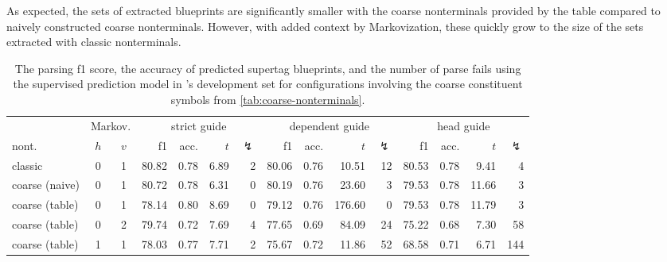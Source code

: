 \documentclass[../../document.tex]{subfiles}
\begin{document}
    As expected, the sets of extracted blueprints are significantly smaller with the coarse nonterminals provided by the table compared to naively constructed coarse nonterminals.
    However, with added context by Markovization, these quickly grow to the size of the sets extracted with classic nonterminals.

    \begin{table}
        \caption{\label{tbl:gridsearch:coarse:2}
        The parsing f1 score, the accuracy of predicted supertag blueprints, and the number of parse fails using the supervised prediction model in \negra{}'s development set for configurations involving the coarse constituent symbols from \cref{tab:coarse-nonterminals}.
        }
        \centering
        \vspace{.2cm}
        \setlength{\tabcolsep}{3.4pt}
        \begin{tabular}{lcc|rrrr|rrrr|rrrr}
            \toprule
& \multicolumn{2}{c|}{Markov.}         & \multicolumn{4}{c|}{strict guide} &  \multicolumn{4}{c|}{dependent guide} &  \multicolumn{4}{c}{head guide} \\
nont.           & \(h\) & \(v\) & f1 & acc. & $t$ & $\lightning$ & f1 & acc. & $t$ & $\lightning$  & f1 & acc. & $t$ & $\lightning$  \\ \hline\rowcolor{black!10}
classic        & 0 & 1 & 80.82 & 0.78 & 6.89 & 2 & 80.06 & 0.76 &  10.51 & 12 & 80.53 & 0.78 &  9.41 & 4 \\\rowcolor{black!10}
coarse (naive) & 0 & 1 & 80.72 & 0.78 & 6.31 & 0 & 80.19 & 0.76 &  23.60 &  3 & 79.53 & 0.78 & 11.66 & 3 \\\hline
coarse (table) & 0 & 1 & 78.14 & 0.80 & 8.69 & 0 & 79.12 & 0.76 & 176.60 &  0 & 79.53 & 0.78 & 11.79 & 3 \\
coarse (table) & 0 & 2 & 79.74 & 0.72 & 7.69 & 4 & 77.65 & 0.69 &  84.09 & 24 & 75.22 & 0.68 &  7.30 & 58 \\
coarse (table) & 1 & 1 & 78.03 & 0.77 & 7.71 & 2 & 75.67 & 0.72 &  11.86 & 52 & 68.58 & 0.71 &  6.71 & 144 \\
\bottomrule
        \end{tabular}
    \end{table}
\end{document}
